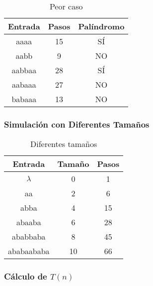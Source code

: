 \documentclass{uc3mpracticas}
\begin{document}
  \begin{table}[!h]
    \centering
  \begin{tabular}{|c|c|c|}
  \hline
  \textbf{Entrada} & \textbf{Pasos} & \textbf{Palíndromo} \\ \hline
  aaaa             & 15             & SÍ                  \\ \hline
  aabb             & 9              & NO                  \\ \hline
  aabbaa           & 28             & SÍ                  \\ \hline
  aabaaa           & 27             & NO                  \\ \hline
  babaaa           & 13             & NO                  \\ \hline
  \end{tabular}
  \caption{Peor caso}
  \end{table}



  \subsubsection{Simulación con Diferentes Tamaños}

    \begin{table}[!h]
      \centering
    \begin{tabular}{|c|c|c|}
    \hline
    \textbf{Entrada} & \textbf{Tamaño} & \textbf{Pasos} \\ \hline
    $\lambda$           & 0               & 1              \\ \hline
    aa               & 2               & 6              \\ \hline
    abba             & 4               & 15             \\ \hline
    abaaba           & 6               & 28             \\ \hline
    ababbaba         & 8               & 45             \\ \hline
    ababaababa       & 10              & 66             \\ \hline
    \end{tabular}
    \caption{Diferentes tamaños}
    \end{table}

  \subsubsection{Cálculo de $T(n)$}
\end{document}
